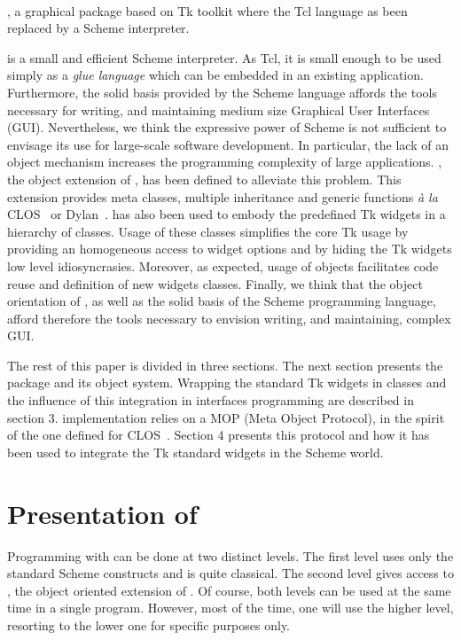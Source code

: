 {\stk}~{\cite{Gallesio93-1}, a graphical package based on Tk toolkit
where the Tcl language as been replaced by a Scheme interpreter. 


{\stk} is a small and efficient Scheme interpreter.  As Tcl, it is
small enough to be used simply as a {\em glue language} which can be
embedded in an existing application. Furthermore, the solid basis
provided by the Scheme language affords the tools necessary for
writing, and maintaining medium size Graphical User Interfaces
(GUI). Nevertheless, we think the expressive power of Scheme is not
sufficient to envisage its use for large-scale software development.
In particular, the lack of an object mechanism increases the
programming complexity of large applications. {\stklos}, the object
extension of {\stk}, has been defined to alleviate this problem.  This
extension provides meta classes, multiple inheritance and generic
functions {\em \`a la} CLOS~\cite{CLOS,CLtL2} or Dylan~\cite{Dylan}.
{\stklos} has also been used to embody the predefined Tk widgets in a
hierarchy of classes. Usage of these classes simplifies the core Tk
usage by providing an homogeneous access to widget options and by
hiding the Tk widgets low level idiosyncrasies. Moreover, as expected,
usage of objects facilitates code reuse and definition of new widgets
classes. Finally, we think that the object orientation of {\stklos},
as well as the solid basis of the Scheme programming language, afford
therefore the tools necessary to envision writing, and maintaining,
complex GUI.


The rest of this paper is divided in three sections. The next section
presents the {\stk} package and its object system. Wrapping the
standard Tk widgets in {\stklos} classes and the influence of this
integration in interfaces programming are described in section 3.
{\stklos} implementation relies on a MOP (Meta Object Protocol), in
the spirit of the one defined for CLOS~\cite{AMOP}. Section 4 presents
this protocol and how it has been used to integrate the Tk standard
widgets in the Scheme world.



\section{Presentation of {\stklos}}

Programming with {\stk} can be done at two distinct levels. The first
level uses only the standard Scheme constructs and is quite
classical. The second level gives access to {\stklos}, the object
oriented extension of {\stk}. Of course, both levels can be used at
the same time in a single program. However, most of the time, one will
use the higher level, resorting to the lower one for specific purposes
only.

}
